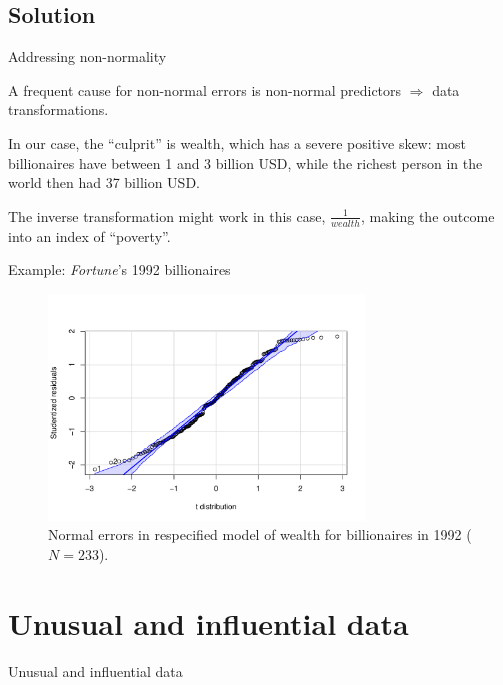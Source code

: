 \documentclass[12pt,english,pdf,xcolor=dvipsnames,aspectratio=169,handout]{beamer}\usepackage[]{graphicx}\usepackage[]{xcolor}
\begin{document}
\subsection{Solution}

\begin{frame}{Addressing non-normality}

A frequent cause for non-normal errors is non-normal predictors $\Rightarrow$ data transformations.\bigskip

In our case, the ``culprit'' is wealth, which has a severe positive skew: most billionaires have between 1 and 3 billion USD, while the richest person in the world then had 37 billion USD.\bigskip

The inverse transformation might work in this case, $\frac{1}{wealth}$, making the outcome into an index of ``poverty''.

\end{frame}


\begin{frame}{Example: \textit{Fortune}'s 1992 billionaires}

\begin{figure}
\includegraphics[width=0.75\textwidth]{../04-graphs/01-10.pdf}
\caption{\label{fig:fig-13} Normal errors in respecified model of wealth for billionaires in 1992 ($N=233$).}
\end{figure}

\end{frame}





\section{Unusual and influential data}


\begin{frame}
\begin{center}
    \Huge Unusual and influential data
\end{center}
\end{frame}
\end{document}
